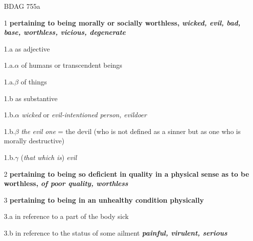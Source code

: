 				\begin{compactdesc}
				
					\item[BDAG 755a] \textbf{}
						\begin{compactitem}
							\item[1] \textbf{pertaining to being morally or socially worthless, \textit{wicked, evil, bad, base, worthless, vicious, degenerate}}
							\item[1.a] as adjective
							\item[1.a.$\alpha$] of humans or transcendent beings
							\item[1.a.$\beta$] of things
							\item[1.b] as substantive
							\item[1.b.$\alpha$] \textit{wicked} or \textit{evil-intentioned person, evildoer}
							\item[1.b.$\beta$]  \textit{the evil one} = the devil (who is not defined as a sinner but as one who is morally destructive) 
							\item[1.b.$\gamma$]  (\textit{that which is}) \textit{evil} 
							\item[2] \textbf{pertaining to being so deficient in quality in a physical sense as to be worthless, \textit{of poor quality, worthless}}
							\item[3] \textbf{pertaining to being in an unhealthy condition physically}
							\item[3.a] in reference to a part of the body sick
							\item[3.b] in reference to the status of some ailment \textbf{\textit{painful, virulent, serious}}
						\end{compactitem}
						
						
						
						
				\end{compactdesc}
				
